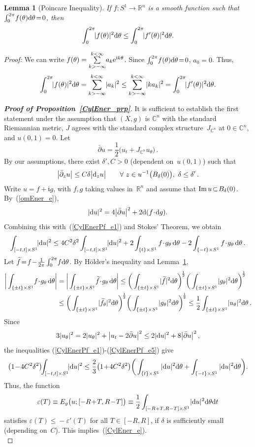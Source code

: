 \documentclass[11pt]{article}
\numberwithin{equation}{section}
\newtheorem{lmm}[thm]{Lemma}
\theoremstyle{definition}
\def\BE#1{\begin{equation}\label{#1}}
\def\EE{\end{equation}}
\def\eref#1{(\ref{#1})}
\def\ti#1{\widetilde{#1}}
\def\lra{\longrightarrow}
\def\C{\mathbb{C}}
\def\fI{\mathfrak i}
\def\R{\mathbb R}
\def\de{\delta}
\def\th{\theta}
\def\ve{\varepsilon}
\def\i{\infty}
\def\prt{\partial}
\def\Im{\textnormal{Im}}
\def\nd{\textnormal{d}}
\def\ne{\textnormal{e}}
\begin{document}
\begin{lmm}[Poincare Inequality]\label{poin_lmm}
If $f\!: S^1\!\lra\!\R^n$ is a smooth function such that
$\int_0^{2\pi}\!f(\th)\nd\th\!=\!0$, then
$$\int_0^{2\pi}\!\!|f(\th)|^2\nd\th\le\int_0^{2\pi}\!\!|f'(\th)|^2\nd\th.$$
\end{lmm}

\noindent
{\it Proof:} We can write 
$f(\th)=\sum\limits_{k>-\i}\limits^{k<\i}\!a_k\ne^{\fI k\th}$.
Since $\int_0^{2\pi}\!f(\th)\nd\th\!=\!0$, $a_0\!=\!0$. Thus,
$$\int_0^{2\pi}\!\!|f(\th)|^2\nd\th=
\sum_{k>-\i}^{k<\i}\!|a_k|^2\le 
\sum_{k>-\i}^{k<\i}\!|ka_k|^2=
\int_0^{2\pi}\!\!|f'(\th)|^2\nd\th.$$


\begin{proof}[{\bf\emph{Proof of Proposition~\ref{CylEner_prp}}}]
It is sufficient to establish the first statement under the assumption that 
$(X,g)$ is $\C^n$ with the standard Riemannian metric,
$J$ agrees with the standard complex structure~$J_{\C^n}$ at $0\!\in\!\C^n$,
and $u(0,1)\!=\!0$.
Let 
$$\bar\prt u=\frac12\big(u_t+J_{\C^n}u_{\th}\big)\,.$$
By our assumptions, there exist $\de',C\!>\!0$ (dependent on~$u(0,1)$) such that 
\BE{CylEnerPf_e1} \big|\bar\prt_z u\big|\le C\de \big|\nd_z u\big|
\qquad\forall~z\in u^{-1}\big(B_{\de}(0)\big),~\de\le\de'\,.\EE
Write $u\!=\!f\!+\!\fI g$, with $f,g$ taking values in~$\R^n$
and assume that $\Im\,u\!\subset\!B_{\de}(0)$.
By~\eref{omEner_e}, 
$$|\nd u|^2=4\big|\bar\prt u\big|^2+2\nd(f\!\cdot\!\nd g).$$
Combining this with~\eref{CylEnerPf_e1} and Stokes' Theorem, we obtain
\BE{CylEnerPf_e3}
\int_{[-t,t]\times S^1}\!\!|\nd u|^2
\le 4C^2\de^2\int_{[-t,t]\times S^1}\!\!|\nd u|^2
+2\int_{\{t\}\times S^1}f\!\cdot\!g_{\th}\,\nd\th
-2\int_{\{-t\}\times S^1}f\!\cdot\!g_{\th}\,\nd\th\,.\EE
Let $\ti{f}\!=\!f\!-\!\frac1{2\pi}\int_0^{2\pi}\!f\nd\th$.
By H\"older's inequality and Lemma~\ref{poin_lmm}, 
\BE{CylEnerPf_e5}\begin{split}
\bigg|\int_{\{\pm t\}\times S^1}\!f\!\cdot\!g_{\th}\,\nd\th\bigg|
&=\bigg|\int_{\{\pm t\}\times S^1}\!\ti{f}\!\cdot\!g_{\th}\,\nd\th\bigg|
\le \bigg(\int_{\{\pm t\}\times S^1}\!|\ti{f}|^2\nd\th \bigg)^{\!\frac12}
\bigg(\int_{\{\pm t\}\times S^1}\!|g_{\th}|^2\nd\th \bigg)^{\!\frac12}\\
&\le \bigg(\int_{\{\pm t\}\times S^1}\!|\ti{f}_{\th}|^2\nd\th \bigg)^{\!\frac12}
\bigg(\int_{\{\pm t\}\times S^1}\!|g_{\th}|^2\nd\th \bigg)^{\!\frac12}
\le \frac12 \int_{\{\pm t\}\times S^1}\!|u_{\th}|^2\nd\th\,.
\end{split}\EE
Since 
$$3|u_{\th}|^2=2|u_{\th}|^2+\big|u_t-2\bar\prt u\big|^2
\le 2|\nd u|^2 + 8\big|\bar\prt u\big|^2\,, $$
the inequalities \eref{CylEnerPf_e1}-\eref{CylEnerPf_e5} give
$$ \big(1\!-\!4C^2\de^2\big)\!\!\int_{[-t,t]\times S^1}\!\!|\nd u|^2
\le \frac{2}{3}\big(1\!+\!4C^2\de^2\big) 
\bigg(\int_{\{t\}\times S^1}|\nd u|^2\nd\th
+\int_{\{-t\}\times S^1}|\nd u|^2\nd\th\bigg).$$
Thus, the function 
$$\ve(T)\equiv E_g\big(u;[-R\!+\!T,R\!-\!T]\big)
\equiv \frac12\int_{[-R+T,R-T]\times S^1}\!|\nd u|^2\nd\th\nd t$$
satisfies $\ve(T)\!\le\!-\ve'(T)$ for all $T\!\in\![-R,R]$,
if $\de$ is sufficiently small (depending on~$C$).
This implies~\eref{CylEner_e}.\\


\end{proof}
\end{document}
